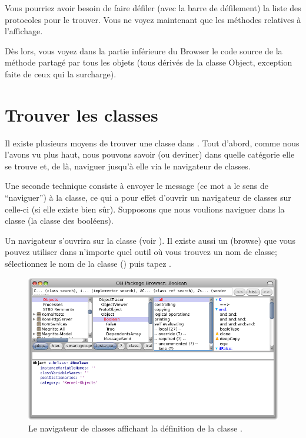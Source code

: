 \documentclass[a4paper,10pt,twoside]{book}
\begin{document}
Vous pourriez avoir besoin de faire défiler (avec la barre de
défilement) la liste des protocoles pour le trouver.
Vous ne voyez maintenant que les méthodes relatives à
l'affichage.

Dès lors, vous voyez dans la partie inférieure du Browser
le code source de la méthode  partagé par tous
les objets 
(tous dérivés de la classe Object,
exception faite de ceux qui la surcharge).

\section{Trouver les classes}

Il existe plusieurs moyens de trouver une classe dans \pharo.
Tout d'abord, comme nous l'avons vu plus haut, nous pouvons savoir (ou
deviner) dans quelle catégorie elle se trouve et, de là, naviguer
jusqu'à elle via le navigateur de classes.

Une seconde technique consiste à envoyer le message 
(ce mot a le sens de ``naviguer'') à la classe, ce qui a pour effet
d'ouvrir un navigateur de classes sur celle-ci
(si elle existe bien sûr).
Supposons que nous voulions naviguer dans la classe 
(la classe des booléens).

Un navigateur s'ouvrira sur la classe  (voir ).
Il existe aussi un   (browse) que vous
pouvez utiliser dans n'importe quel outil où vous trouvez un nom de
classe;
sélectionnez le nom de la classe 
(\parex {})
puis tapez .


\begin{figure}[hbt]
	{\centerline {\includegraphics[width=\textwidth]{Kernel-objects-boolean}}}
\caption{Le navigateur de classes affichant la définition de la
  classe .}
\end{figure}
\end{document}
